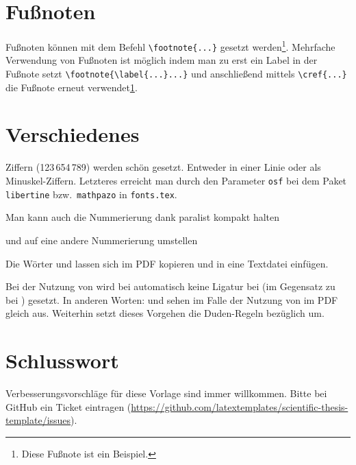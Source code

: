 \section{Fußnoten}
Fußnoten können mit dem Befehl \verb+\footnote{...}+ gesetzt werden\footnote{\label{fussnote}Diese Fußnote ist ein Beispiel.
}.
Mehrfache Verwendung von Fußnoten ist möglich indem man zu erst ein Label in der Fußnote setzt \verb+\footnote{\label{...}...}+ und anschließend mittels \verb+\cref{...}+ die Fußnote erneut verwendet\cref{fussnote}.


\section{Verschiedenes}
\label{sec:diff}
\ifdeutsch
  Ziffern (123\,654\,789) werden schön gesetzt.
  Entweder in einer Linie oder als Minuskel-Ziffern.
  Letzteres erreicht man durch den Parameter \texttt{osf} bei dem Paket \texttt{libertine} bzw.\ \texttt{mathpazo} in \texttt{fonts.tex}.
\fi

\begin{compactenum}[I.]
  \item Man kann auch die Nummerierung dank paralist kompakt halten
  \item und auf eine andere Nummerierung umstellen
\end{compactenum}

Die Wörter  und  lassen sich im PDF kopieren und in eine Textdatei einfügen.

Bei der Nutzung von \LuaLaTeX{} wird bei  automatisch keine Ligatur bei  (im Gegensatz zu  bei ) gesetzt.
In anderen Worten:  und  sehen im Falle der Nutzung von \LuaLaTeX{} im PDF gleich aus.
Weiterhin setzt dieses Vorgehen die Duden-Regeln bezüglich  \cite[S.\ 96]{Duden2001} um.

\section{Schlusswort}
Verbesserungsvorschläge für diese Vorlage sind immer willkommen.
Bitte bei GitHub ein Ticket eintragen (\url{https://github.com/latextemplates/scientific-thesis-template/issues}).
